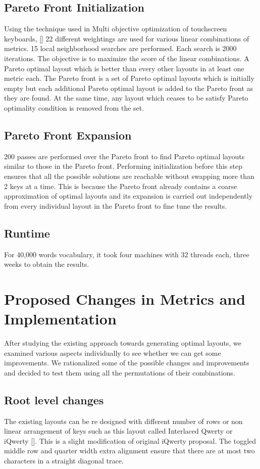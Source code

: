 \documentclass[MTech]{iitmdiss}
\begin{document}
\section{Pareto Front Initialization}
Using the technique used in Multi objective optimization of touchscreen keyboards, [\cite{weighting}] 22 different weightings are used for various linear combinations of metrics.
15 local neighborhood searches are performed. Each search is 2000 iterations.
The objective is to maximize the score of the linear combinations.
A Pareto optimal layout which is better than every other layouts in at least one metric each. The Pareto front is a set of Pareto optimal layouts which is initially empty but each additional Pareto optimal layout is added to the Pareto front as they are found. At the same time, any layout which ceases to be satisfy Pareto optimality condition is removed from the set. 

\section{Pareto Front Expansion}
200 passes are performed over the Pareto front to find Pareto optimal layouts similar to those in the Pareto front.
Performing initialization before this step ensures that all the possible solutions are reachable without swapping more than 2 keys at a time. This is because the Pareto front already contains a coarse approximation of optimal layouts and its expansion is carried out independently from every individual layout in the Pareto front to fine tune the results.

\section{Runtime}
For 40,000 words vocabulary, it took four machines with 32 threads each, three weeks to obtain the results.

\chapter{Proposed Changes in Metrics and Implementation}
After studying the existing approach towards generating optimal layouts, we examined various aspects individually to see whether we can get some improvements. We rationalized some of the possible changes and improvements and decided to test them using all the permutations of their combinations.

\section{Root level changes}
The existing layouts can be re designed with different number of rows or non linear arrangement of keys such as this layout called Interlaced Qwerty or iQwerty [\cite{iqwerty}]. This is a slight modification of original iQwerty proposal. The toggled middle row and quarter width extra alignment ensure that there are at most two characters in a straight diagonal trace. 
\end{document}
